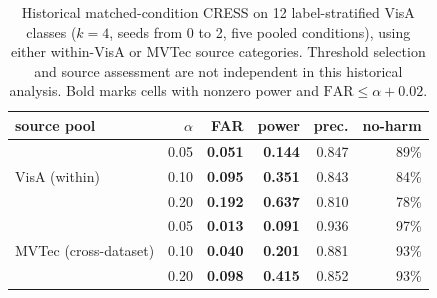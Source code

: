 \begin{table}[pos=t]
\centering
\caption{Historical matched-condition CRESS on 12 label-stratified VisA classes ($k{=}4$, seeds from 0 to 2, five pooled conditions), using either within-VisA or MVTec source categories. Threshold selection and source assessment are not independent in this historical analysis. Bold marks cells with nonzero power and $\mathrm{FAR}\le\alpha{+}0.02$.}
\label{tab:sc3r-visa}
\footnotesize
\setlength{\tabcolsep}{4pt}
\begin{tabular}{lrrrrr}
\toprule
source pool & $\alpha$ & FAR & power & prec. & no-harm \\
\midrule
\multirow{3}{*}{VisA (within)} & 0.05 & \textbf{0.051} & \textbf{0.144} & 0.847 & 89\% \\
 & 0.10 & \textbf{0.095} & \textbf{0.351} & 0.843 & 84\% \\
 & 0.20 & \textbf{0.192} & \textbf{0.637} & 0.810 & 78\% \\
\midrule
\multirow{3}{*}{MVTec (cross-dataset)} & 0.05 & \textbf{0.013} & \textbf{0.091} & 0.936 & 97\% \\
 & 0.10 & \textbf{0.040} & \textbf{0.201} & 0.881 & 93\% \\
 & 0.20 & \textbf{0.098} & \textbf{0.415} & 0.852 & 93\% \\
\bottomrule
\end{tabular}
\end{table}
